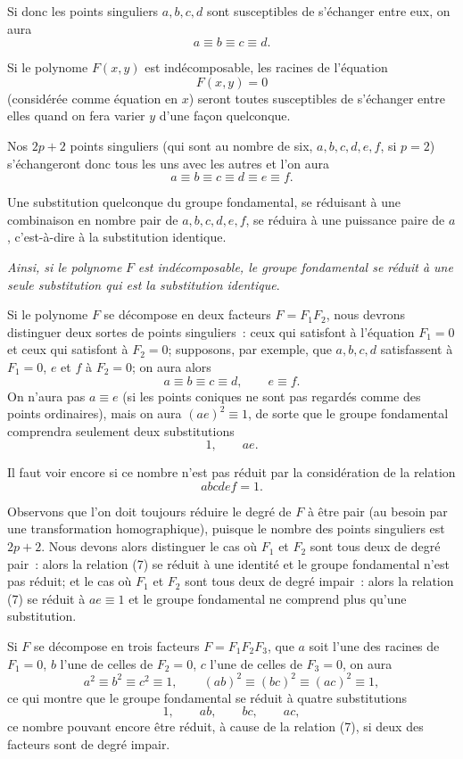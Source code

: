 \documentclass{article}
\begin{document}
Si donc les points singuliers $a, b, c, d$ sont susceptibles de s'échanger entre eux, on aura
\[ a \equiv b \equiv c \equiv d. \]


Si le polynome $F(x, y)$ est indécomposable, les racines de l'équation
\[ F(x, y) = 0 \]
(considérée comme équation en $x$) seront toutes susceptibles de s'échanger entre elles quand on fera varier $y$ d'une façon quelconque.

Nos $2p + 2$ points singuliers (qui sont au nombre de six, $a, b, c, d, e, f$, si $p = 2$) s'échangeront donc tous les uns avec les autres et l'on aura
\[ a \equiv b \equiv c \equiv d \equiv e \equiv f. \]

Une substitution quelconque du groupe fondamental, se réduisant à une combinaison en nombre pair de $a, b, c, d, e, f$, se réduira à une puissance paire de $a$, c'est-à-dire à la substitution identique.

\emph{Ainsi, si le polynome} $F$ \emph{est indécomposable, le groupe fondamental se réduit à une seule substitution qui est la substitution identique}.

Si le polynome $F$ se décompose en deux facteurs $F = F_{1}F_{2}$, nous devrons distinguer deux sortes de points singuliers~: ceux qui satisfont à l'équation $F_{1} = 0$ et ceux qui satisfont à $F_{2} = 0$; supposons, par exemple, que $a, b, c, d$ satisfassent à $F_{1} = 0$, $e$ et $f$ à $F_{2} = 0$; on aura alors
\[ a \equiv b \equiv c \equiv d, \qquad e \equiv f. \]
On n'aura pas $a \equiv e$ (si les points coniques ne sont pas regardés comme des points ordinaires), mais on aura $(ae)^{2} \equiv 1$, de sorte que le groupe fondamental comprendra seulement deux substitutions
\[ 1, \qquad ae. \]

Il faut voir encore si ce nombre n'est pas réduit par la considération de la relation
\[ abcdef = 1. \tag{7} \]

Observons que l'on doit toujours réduire le degré de $F$ à être pair (au besoin par une transformation homographique), puisque le nombre des points singuliers est $2p + 2$. Nous devons alors distinguer le cas où $F_{1}$ et $F_{2}$ sont tous deux de degré pair~: alors
la relation (7) se réduit à une identité et le groupe fondamental n'est pas réduit; et le cas où $F_{1}$ et $F_{2}$ sont tous deux de degré impair~: alors la relation (7) se réduit à $ae \equiv 1$ et le groupe fondamental ne comprend plus qu'une substitution.

Si $F$ se décompose en trois facteurs $F = F_{1}F_{2}F_{3}$, que $a$ soit l'une des racines de $F_{1} = 0$, $b$ l'une de celles de $F_{2} = 0$, $c$ l'une de celles de $F_{3} = 0$, on aura
\[ a^{2} \equiv b^{2} \equiv c^{2} \equiv 1, \qquad (ab)^{2} \equiv (bc)^{2} \equiv (ac)^{2} \equiv 1, \]
ce qui montre que le groupe fondamental se réduit à quatre substitutions
\[ 1, \qquad ab, \qquad bc, \qquad ac, \]
ce nombre pouvant encore être réduit, à cause de la relation (7), si deux des facteurs sont de degré impair.
\end{document}
